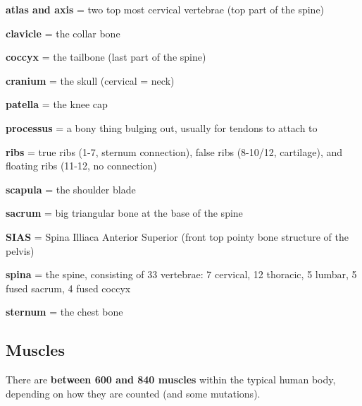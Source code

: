 \begin{itemize*}
    \item \textbf{atlas and axis} = two top most cervical vertebrae (top part of the spine)
    \item \textbf{clavicle} = the collar bone
    \item \textbf{coccyx} = the tailbone (last part of the spine)
    \item \textbf{cranium} = the skull (cervical = neck)
    \item \textbf{patella} = the knee cap
    \item \textbf{processus} = a bony thing bulging out, usually for tendons to attach to
    \item \textbf{ribs} = true ribs (1-7, sternum connection), false ribs (8-10/12, cartilage), and floating ribs (11-12, no connection)
    \item \textbf{scapula} = the shoulder blade
    \item \textbf{sacrum} = big triangular bone at the base of the spine
    \item \textbf{SIAS} = Spina Illiaca Anterior Superior (front top pointy bone structure of the pelvis)
    \item \textbf{spina} = the spine, consisting of 33 vertebrae: 7 cervical, 12 thoracic, 5 lumbar, 5 fused sacrum, 4 fused coccyx
    \item \textbf{sternum} = the chest bone
\end{itemize*}

\subsection{Muscles}\label{subsec:muscles}

There are \textbf{between 600 and 840 muscles} within the typical human body, depending on how they are counted (and some mutations).

